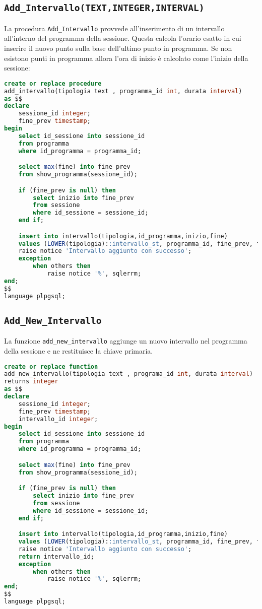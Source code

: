 \subsection{\texttt{Add\_Intervallo(TEXT,INTEGER,INTERVAL)}}
La procedura \texttt{Add\_Intervallo} provvede all'inserimento di un intervallo all'interno del programma della sessione. Questa calcola l'orario esatto in cui inserire il nuovo punto sulla base dell'ultimo punto in programma. Se non esistono punti in programma allora l'ora di inizio è calcolato come l'inizio della sessione:
\begin{lstlisting}[language=SQL,style=mystyle]
create or replace procedure 
add_intervallo(tipologia text , programma_id int, durata interval)
as $$
declare
    sessione_id integer;
    fine_prev timestamp;
begin
    select id_sessione into sessione_id
    from programma
    where id_programma = programma_id;

    select max(fine) into fine_prev
    from show_programma(sessione_id);

    if (fine_prev is null) then
        select inizio into fine_prev
        from sessione
        where id_sessione = sessione_id;
    end if;

    insert into intervallo(tipologia,id_programma,inizio,fine)
    values (LOWER(tipologia)::intervallo_st, programma_id, fine_prev, fine_prev+durata);
    raise notice 'Intervallo aggiunto con successo';
    exception
        when others then
            raise notice '%', sqlerrm;
end;
$$ 
language plpgsql;
\end{lstlisting}
\subsection{\texttt{Add\_New\_Intervallo}}
La funzione \texttt{add\_new\_intervallo} aggiunge un nuovo intervallo nel programma della sessione e ne restituisce la chiave primaria.
\begin{lstlisting}[language=SQL, style=mystyle]
create or replace function 
add_new_intervallo(tipologia text , programa_id int, durata interval)
returns integer
as $$
declare
    sessione_id integer;
    fine_prev timestamp;
    intervallo_id integer;
begin
    select id_sessione into sessione_id
    from programma
    where id_programma = programma_id;

    select max(fine) into fine_prev
    from show_programma(sessione_id);

    if (fine_prev is null) then
        select inizio into fine_prev
        from sessione
        where id_sessione = sessione_id;
    end if;

    insert into intervallo(tipologia,id_programma,inizio,fine)
    values (LOWER(tipologia)::intervallo_st, programma_id, fine_prev, fine_prev+durata) returning id_intervallo into intervallo_id;
    raise notice 'Intervallo aggiunto con successo';
    return intervallo_id;
    exception
        when others then
            raise notice '%', sqlerrm;
end;
$$ 
language plpgsql;
\end{lstlisting}
